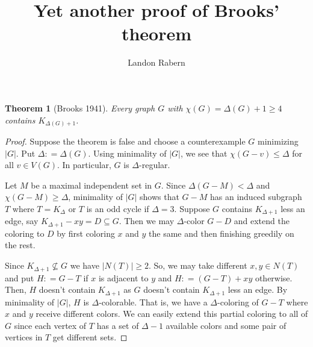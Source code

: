 \documentclass[12pt]{amsart}
\title{Yet another proof of Brooks' theorem}
\author{Landon Rabern}
\theoremstyle{plain}
\newtheorem{thm}{Theorem}
\theoremstyle{definition}
\theoremstyle{remark}
\newcommand{\card}[1]{\left|#1\right|}
\newcommand{\DefinedAs}{\mathrel{\mathop:}=}
\begin{document}
\maketitle

\begin{thm}[Brooks 1941]
Every graph $G$ with $\chi(G) = \Delta(G) + 1 \geq 4$ contains
$K_{\Delta(G) + 1}$.
\end{thm}
\begin{proof}
Suppose the theorem is false and choose a counterexample $G$ minimizing
$\card{G}$.  Put $\Delta \DefinedAs \Delta(G)$. Using minimality of $\card{G}$,
we see that $\chi(G - v) \le \Delta$ for all $v \in
V(G)$. In particular, $G$ is $\Delta$-regular.

Let $M$ be a maximal independent set in $G$.  Since $\Delta(G-M) < \Delta$ and $\chi(G-M) \ge \Delta$, minimality of $|G|$ shows that $G-M$ has an induced subgraph $T$ where $T = K_\Delta$ or $T$ is an odd cycle if $\Delta=3$.   Suppose $G$ contains $K_{\Delta + 1}$ less an edge, say $K_{\Delta + 1} - xy = D \subseteq G$. Then we may $\Delta$-color $G-D$ and extend the coloring to $D$ by first coloring $x$ and $y$ the same and then finishing greedily on the rest.

Since $K_{\Delta + 1} \not \subseteq G$ we have $\card{N(T)} \geq 2$. So, we may take different $x, y \in N(T)$ and put $H \DefinedAs G - T$ if $x$ is adjacent to $y$ and $H \DefinedAs (G-T) + xy$ otherwise.  Then, $H$ doesn't contain $K_{\Delta + 1}$ as $G$ doesn't contain $K_{\Delta + 1}$ less an edge. By minimality of $\card{G}$, $H$ is $\Delta$-colorable. That is, we have a $\Delta$-coloring of $G - T$ where $x$ and $y$ receive different colors.  We can easily extend this partial coloring to all of $G$ since each vertex of $T$ has a set of $\Delta - 1$ available
colors and some pair of vertices in $T$ get different sets.  
\end{proof}
\end{document}
